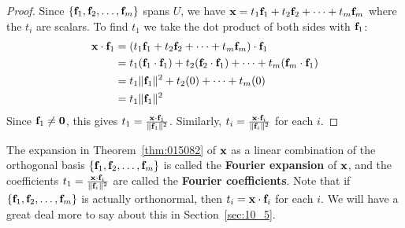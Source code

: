 \begin{proof}
Since $\{\textbf{f}_{1}, \textbf{f}_{2}, \dots, \textbf{f}_{m}\}$ spans $U$, we have $\textbf{x} = t_{1}\textbf{f}_{1} + t_{2}\textbf{f}_{2} + \dots + t_{m}\textbf{f}_{m}$ where the $t_{i}$ are scalars. To find $t_{1}$ we take the dot product of both sides with $\textbf{f}_{1}$:
\begin{align*}
\textbf{x} \cdot \textbf{f}_1 &= (t_1\textbf{f}_1 + t_2\textbf{f}_2 + \dots + t_m\textbf{f}_m) \cdot \textbf{f}_1 \\
&= t_1(\textbf{f}_1 \cdot \textbf{f}_1) + t_2(\textbf{f}_2 \cdot \textbf{f}_1) + \dots + t_m(\textbf{f}_m \cdot \textbf{f}_1) \\
&= t_1\|\textbf{f}_1\|^2 + t_2(0) + \dots + t_m(0) \\
&= t_1\|\textbf{f}_1\|^2
\end{align*}
Since $\textbf{f}_{1} \neq \textbf{0}$, this gives $t_1 = \tfrac{\textbf{x} \cdot \textbf{f}_1}{\|\textbf{f}_1\|^2}$. Similarly,
$t_i = \tfrac{\textbf{x} \cdot \textbf{f}_i}{\|\textbf{f}_i\|^2}$
 for each $i$.
\end{proof}

\noindent The expansion in Theorem~\ref{thm:015082} of $\textbf{x}$ as a linear combination of the orthogonal basis $\{\textbf{f}_{1}, \textbf{f}_{2}, \dots, \textbf{f}_{m}\}$ is called the \textbf{Fourier expansion} of $\textbf{x}$, and the coefficients $t_1 = \tfrac{\textbf{x} \cdot \textbf{f}_i}{\|\textbf{f}_i\|^2}$ are called the \textbf{Fourier coefficients}. Note that if $\{\textbf{f}_{1}, \textbf{f}_{2}, \dots, \textbf{f}_{m}\}$ is actually orthonormal, then $t_{i} = \textbf{x} \cdot \textbf{f}_{i}$ for each $i$. We will have a great deal more to say about this in Section~\ref{sec:10_5}.

